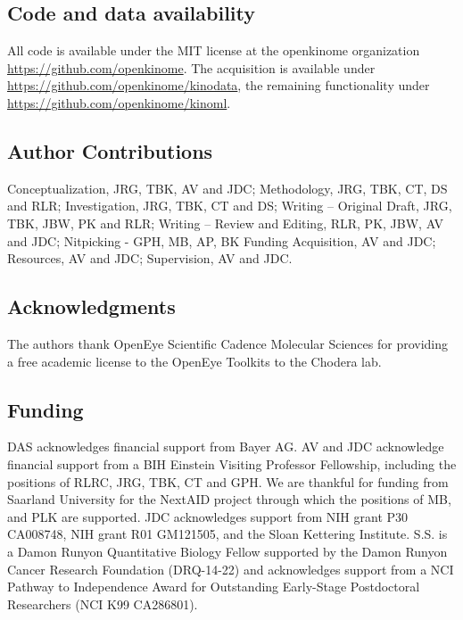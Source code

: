 \documentclass[9pt,lessons]{livecoms}
\begin{document}
\subsection{Code and data availability}
All code is available under the MIT license at the openkinome organization \url{https://github.com/openkinome}. The acquisition is available under \url{https://github.com/openkinome/kinodata}, the remaining functionality under \url{https://github.com/openkinome/kinoml}.

\subsection{Author Contributions}
Conceptualization, JRG, TBK, AV and JDC; 
Methodology, JRG, TBK, CT, DS and RLR; 
Investigation, JRG, TBK, CT and DS; 
Writing – Original Draft, JRG, TBK, JBW, PK and RLR; 
Writing – Review and Editing, RLR, PK, JBW, AV and JDC; 
Nitpicking - GPH, MB, AP, BK
Funding Acquisition, AV and JDC; 
Resources, AV and JDC;
Supervision, AV and JDC.

\subsection{Acknowledgments}

The authors thank OpenEye Scientific Cadence Molecular Sciences for providing a free academic license to the OpenEye Toolkits to the Chodera lab.


\subsection{Funding}

DAS acknowledges financial support from Bayer AG. AV and JDC acknowledge financial support from a BIH Einstein Visiting Professor Fellowship, including the positions of RLRC, JRG, TBK, CT and GPH. We are thankful for funding from Saarland University for the NextAID project through which the positions of MB, and PLK are supported. JDC acknowledges support from NIH grant P30 CA008748, NIH grant R01 GM121505, and the Sloan Kettering Institute.  S.S. is a Damon Runyon Quantitative Biology Fellow supported by the Damon Runyon Cancer Research Foundation (DRQ-14-22) and acknowledges support from a NCI Pathway to Independence Award for Outstanding Early-Stage Postdoctoral Researchers (NCI K99 CA286801).
\end{document}
